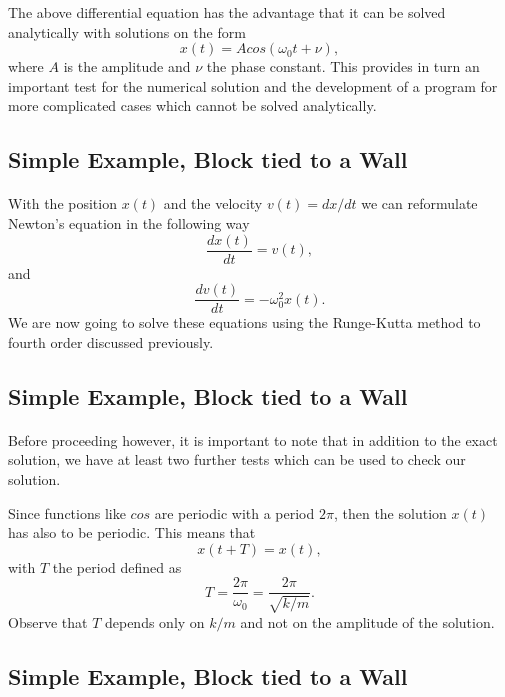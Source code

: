 \documentclass[%
oneside,                 %
final,                   %
10pt]{article}
\begin{document}
The above differential equation has the advantage that it can be solved  analytically with solutions on the form
  \[
     x(t)=Acos(\omega_0t+\nu),
  \]
where $A$ is the amplitude and $\nu$ the phase constant.   This provides in turn an important test for the numerical
solution and the development of a program for more complicated cases which cannot be solved analytically.




\subsection{Simple Example, Block tied to a Wall}

\paragraph{}
With the position $x(t)$ and the velocity  $v(t)=dx/dt$ we can reformulate Newton's equation in the following way
  \[
      \frac{dx(t)}{dt}=v(t),
  \]
  and
  \[
      \frac{dv(t)}{dt}=-\omega_0^2x(t).
  \]
  We are now going to solve these equations using the Runge-Kutta method
  to fourth order discussed previously.



\subsection{Simple Example, Block tied to a Wall}

\paragraph{}
Before proceeding however, it is important to note that in addition to the exact solution, we have at least two further tests which can be used to check our solution. 

Since functions like $cos$ are periodic with a period $2\pi$, then the solution $x(t)$ has also to be periodic. This means that
\[
     x(t+T)=x(t),
\]
with $T$ the period defined as 
\[
     T=\frac{2\pi}{\omega_0}=\frac{2\pi}{\sqrt{k/m}}.
\]
Observe that $T$ depends only on $k/m$ and not on the amplitude of the solution.



\subsection{Simple Example, Block tied to a Wall}
\end{document}
